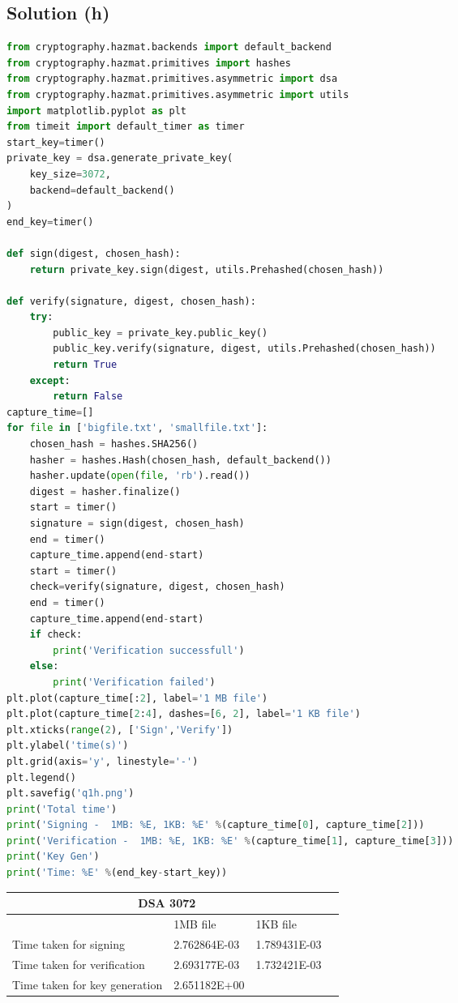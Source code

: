\documentclass[12pt]{article}%
\begin{document}
\subsection{Solution (h)}
\begin{lstlisting}[language=Python]
from cryptography.hazmat.backends import default_backend
from cryptography.hazmat.primitives import hashes
from cryptography.hazmat.primitives.asymmetric import dsa
from cryptography.hazmat.primitives.asymmetric import utils
import matplotlib.pyplot as plt
from timeit import default_timer as timer
start_key=timer()
private_key = dsa.generate_private_key(
    key_size=3072,
    backend=default_backend()
)
end_key=timer()

def sign(digest, chosen_hash):
    return private_key.sign(digest, utils.Prehashed(chosen_hash))

def verify(signature, digest, chosen_hash):
    try:
        public_key = private_key.public_key()
        public_key.verify(signature, digest, utils.Prehashed(chosen_hash))
        return True
    except:
        return False
capture_time=[]
for file in ['bigfile.txt', 'smallfile.txt']:
    chosen_hash = hashes.SHA256()
    hasher = hashes.Hash(chosen_hash, default_backend())
    hasher.update(open(file, 'rb').read())
    digest = hasher.finalize()
    start = timer()
    signature = sign(digest, chosen_hash)
    end = timer()
    capture_time.append(end-start)
    start = timer()
    check=verify(signature, digest, chosen_hash)
    end = timer()
    capture_time.append(end-start)
    if check:
        print('Verification successfull')
    else:
        print('Verification failed')
plt.plot(capture_time[:2], label='1 MB file')
plt.plot(capture_time[2:4], dashes=[6, 2], label='1 KB file')
plt.xticks(range(2), ['Sign','Verify'])
plt.ylabel('time(s)')
plt.grid(axis='y', linestyle='-')
plt.legend()
plt.savefig('q1h.png')
print('Total time')
print('Signing -  1MB: %E, 1KB: %E' %(capture_time[0], capture_time[2]))
print('Verification -  1MB: %E, 1KB: %E' %(capture_time[1], capture_time[3]))
print('Key Gen')
print('Time: %E' %(end_key-start_key))

\end{lstlisting}
\begin{tabular}{ |p{8cm}|p{3cm}|p{3cm}|p{3cm} }
 \hline
 \multicolumn{3}{|c|}{DSA 3072} \\
 \hline
	 & 1MB file & 1KB file\\
 \hline
 Time taken for signing  &   2.762864E-03   &  1.789431E-03 \\
  \hline
 Time taken for verification &   2.693177E-03 & 	1.732421E-03\\
 \hline
 Time taken for key generation & 2.651182E+00   & 	\\
 \hline
\end{tabular}
\end{document}

